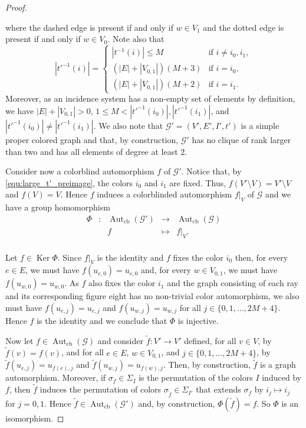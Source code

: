 \documentclass[10pt,a4paper]{amsart}
\newcommand{\Aut}{\operatorname{Aut}}
\newcommand{\Autcb}{\Aut_{\text{cb}}}
\newcommand{\G}{\mathcal{G}}
\newcommand{\Ker}{\operatorname{Ker}}
\begin{document}
\begin{proof}
\begin{center}
\end{center}
where the dashed edge is present if and only if $w\in V_1$ and the dotted edge is present if and only if $w\in V_0$. Note also that
\begin{equation}\label{equ:large_t'_preimage}
 |t'^{-1}(i)|=\begin{cases} |t^{-1}(i)|\leq M &\text{if $i\neq i_0,i_1$},\\
(|E|+|V_{0,1}|)(M+3)&\text{if $i=i_0$},\\
(|E|+|V_{0,1}|)(M+2)&\text{if $i=i_1$}.
\end{cases}
\end{equation}
Moreover, as an incidence system has a non-empty set of elements by definition, we have $|E|+|V_{0,1}|>0$, $1\leq M<|t'^{-1}(i_0)|,|t'^{-1}(i_1)|$, and $|t'^{-1}(i_0)|\neq |t'^{-1}(i_1)|$. We also note that $\mathcal{G}'=(V',E',I',t')$ is a simple proper colored graph and that, by construction, $\mathcal{G}'$ has no clique of rank larger than two and has all elements of degree at least $2$.

Consider now a colorblind automorphism $f$ of $\mathcal{G}'$. Notice that, by \eqref{equ:large_t'_preimage}, the colors $i_0$ and $i_1$ are fixed. Thus, $f(V'\setminus V)=V'\setminus V$ and $f(V)=V$. Hence $f$ induces a colorblinded automorphism $f|_V$ of $\mathcal{G}$ and we have a group homomorphism
\[\begin{array}{ccccc}
\Phi & : & \Autcb(\G') & \to & \Autcb(\G) \\
 & & f & \mapsto & f|_V. \\
\end{array}\]

Let $f\in \Ker \Phi$. Since $f|_V$ is the identity and $f$ fixes the color $i_0$ then, for every $e\in E$, we must have $f(u_{e,0})=u_{e,0}$ and, for every $w\in V_{0,1}$, we must have $f(u_{w,0})=u_{w,0}$. As $f$ also fixes the color $i_1$ and the graph consisting of each ray and its corresponding figure eight has no non-trivial color automorphism, we also must have $f(u_{e,j})=u_{e,j}$ and $f(u_{w,j})=u_{w,j}$ for all $j\in\{0,1,\dots,2M+4\}$. Hence $f$ is the identity and we conclude that $\Phi$ is injective. 

Now let $f\in\Autcb(\mathcal{G})$ and consider $\widetilde{f}\colon V'\to V'$ defined, for all $v\in V$, by $\widetilde{f}(v)=f(v)$, and for all $e\in E$, $w\in V_{0,1}$, and $j\in\{0,1,\dots,2M+4\}$, by $\widetilde{f}(u_{e,j})=u_{f(e),j}$ and $\widetilde{f}(u_{w,j})=u_{f(w),j}$. Then, by construction, $\widetilde{f}$ is a graph automorphism. Moreover, if $\sigma_f\in \Sigma_I$ is the permutation of the colors $I$ induced by $f$, then $\widetilde{f}$ induces the permutation of colors $\sigma_{\widetilde{f}}\in \Sigma_{I'}$ that extends $\sigma_f$ by $i_j\mapsto i_j$ for $j=0,1$. Hence $\widetilde{f}\in\Autcb(\mathcal{G}')$ and, by construction, $\Phi(\widetilde{f})=f$. So $\Phi$ is an isomorphism. 


\end{proof}
\end{document}
